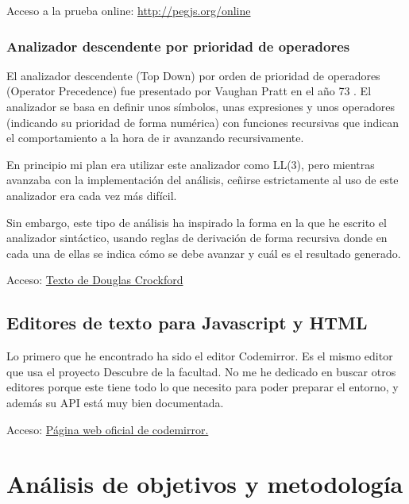 \documentclass{report}
\begin{document}
	Acceso a la prueba online:
	\href{http://pegjs.org/online}{http://pegjs.org/online}
	
	\subsection{Analizador descendente por prioridad de operadores}
	
	
	El analizador descendente (Top Down) por orden de prioridad de operadores (Operator Precedence) fue presentado por Vaughan Pratt en el año 73 \cite{acmtdop}. El analizador se basa en definir unos símbolos, unas expresiones y unos operadores (indicando su prioridad de forma numérica) con funciones recursivas que indican el comportamiento a la hora de ir avanzando recursivamente.
	
	En principio mi plan era utilizar este analizador como LL(3), pero mientras avanzaba con la implementación del análisis, ceñirse estrictamente al uso de este analizador era cada vez más difícil. 
	
	Sin embargo, este tipo de análisis ha inspirado la forma en la que he escrito el analizador sintáctico, usando reglas de derivación de forma recursiva donde en cada una de ellas se indica
	cómo se debe avanzar y cuál es el resultado generado. 
	
	Acceso:
	\href{http://javascript.crockford.com/tdop/tdop.html}{Texto de Douglas Crockford}
		
	\section{Editores de texto para Javascript y HTML}
	
	Lo primero que he encontrado ha sido el editor Codemirror. Es el mismo editor que usa el proyecto Descubre de la facultad. No me he dedicado en buscar otros editores porque este tiene
	todo lo que necesito para poder preparar el entorno, y además su API está muy bien documentada\cite{codemirrorapi}.
	
	Acceso:
	\href{http://codemirror.net/}{Página web oficial de codemirror.}
	
	\chapter{Análisis de objetivos y metodología}
	
	
\end{document}
